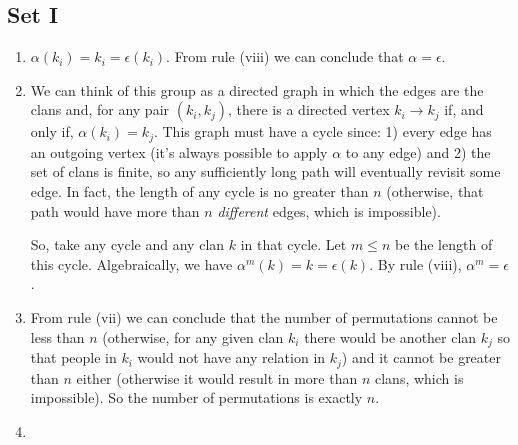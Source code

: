 \documentclass{article}
\begin{document}
\subsection{Set I}
\begin{enumerate}
    \item $\alpha(k_i) = k_i = \epsilon(k_i)$. From rule (viii) we can conclude that $\alpha = \epsilon$.

    \item We can think of this group as a directed graph in which the edges are the clans and, for any pair $(k_i, k_j)$, there is a directed vertex $k_i \to k_j$ if, and only if, $\alpha(k_i) = k_j$. This graph must have a cycle since: 1) every edge has an outgoing vertex (it's always possible to apply $\alpha$ to any edge) and 2) the set of clans is finite, so any sufficiently long path will eventually revisit some edge. In fact, the length of any cycle is no greater than $n$ (otherwise, that path would have more than $n$ \emph{different} edges, which is impossible).

    So, take any cycle and any clan $k$ in that cycle. Let $m \leqslant n$ be the length of this cycle. Algebraically, we have $\alpha^m(k) = k = \epsilon(k)$. By rule (viii), $\alpha^m = \epsilon$.

    \item From rule (vii) we can conclude that the number of permutations cannot be less than $n$ (otherwise, for any given clan $k_i$ there would be another clan $k_j$ so that people in $k_i$ would not have any relation in $k_j$) and it cannot be greater than $n$ either (otherwise it would result in more than $n$ clans, which is impossible). So the number of permutations is exactly $n$.

    \item 
\end{enumerate}
\end{document}

